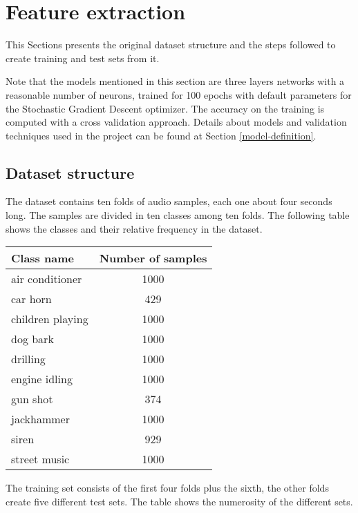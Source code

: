 \section{Feature extraction}
\label{feature-extraction}

This Sections presents the original dataset structure and the 
steps followed to create training and test sets from it.

Note that the models mentioned in this section are
three layers networks with a reasonable number of neurons, trained 
for 100 epochs with default parameters for the Stochastic Gradient 
Descent optimizer. 
The accuracy on the training is computed with a cross validation 
approach.
Details about models and validation techniques used in 
the project can be found at Section \vref{model-definition}.

\subsection{Dataset structure}
\label{dataset-structure}

The dataset contains ten folds of audio samples, each one about 
four seconds long. The samples are divided in ten classes among ten 
folds. The following table shows the classes and their relative frequency 
in the dataset.

\begin{center}
    \begin{tabular}{ |l|c| } 
        \hline
        Class name & Number of samples \\
        \hline
        air conditioner & 1000 \\
        car horn & 429 \\
        children playing & 1000 \\
        dog bark & 1000 \\
        drilling & 1000 \\
        engine idling & 1000 \\
        gun shot & 374 \\
        jackhammer & 1000 \\
        siren & 929 \\
        street music & 1000 \\
        \hline
    \end{tabular}
\end{center}

The training set consists of the first four folds plus the sixth, 
the other folds create five different test sets.
The table shows the numerosity of the different sets.

